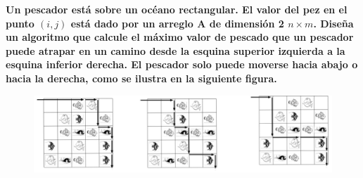 \textbf{Un pescador est\'a sobre un oc\'eano rectangular. El valor del pez en el punto $(i, j)$ est\'a dado por un arreglo A de dimensi\'on 2 $n \times m$. Dise\~na un algoritmo que calcule el m\'aximo valor de pescado que un pescador puede atrapar en un camino desde la esquina superior izquierda a la esquina inferior derecha. El pescador solo puede moverse hacia abajo o hacia la derecha, como se ilustra en la siguiente figura.}\vspace{.2cm}

\begin{figure}[H]
    \centering
    \includegraphics[width=0.75\linewidth]{src/Img/lago.PNG}
\end{figure}

\textcolor{bibi}{}
\begin{quote}
\end{quote}
